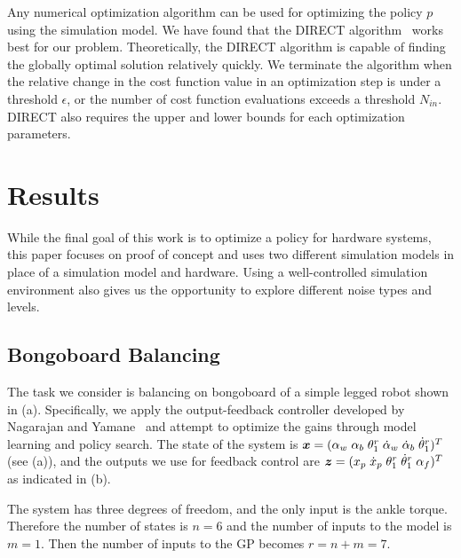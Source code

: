 \documentclass[letterpaper, 10 pt, conference]{ieeeconf}
\begin{document}
Any numerical optimization algorithm can be used for optimizing the
policy $p$ using the simulation model.
We have found that the DIRECT algorithm~\cite{bib-jones-direct} works
best for our problem.
Theoretically, the DIRECT algorithm is capable of finding the globally
optimal solution relatively quickly.
We terminate the algorithm when the relative change in the cost function
value in an optimization step is under a threshold $\epsilon$, or the
number of cost function evaluations exceeds a threshold $N_{in}$.
DIRECT also requires the upper and lower bounds for each optimization
parameters.

\section{Results}  \label{sec:learning_results}

While the final goal of this work is to optimize a policy for hardware
systems, this paper focuses on proof of concept and uses two different
simulation models in place of a simulation model and hardware.
Using a well-controlled simulation environment also gives us the
opportunity to explore different noise types and levels.

\subsection{Bongoboard Balancing}

The task we consider is balancing on bongoboard of a simple legged
robot shown in (a).
Specifically, we apply the output-feedback controller developed by
Nagarajan and Yamane~\cite{bib-icra14-universal} and attempt to optimize
the gains through model learning and policy search.
The state of the system is $\mbox{\boldmath \(x\)} = (\alpha_w\; \alpha_b\;
\theta_1^r\; \dot{\alpha}_w\; \dot{\alpha}_b\; \dot{\theta}_1^r)^T$ (see
(a)), and the outputs we use for feedback control
are 
$\mbox{\boldmath \(z\)} = (x_p\; \dot{x}_p\; \theta_1^r\; \dot{\theta}_1^r\; \alpha_f)^T$ as
indicated in (b).

The system has three degrees of freedom, and the only input is the
ankle torque.
Therefore the number of states is $n = 6$ and the number of inputs to
the model is $m=1$.
Then the number of inputs to the GP becomes $r=n+m=7$.
\end{document}
